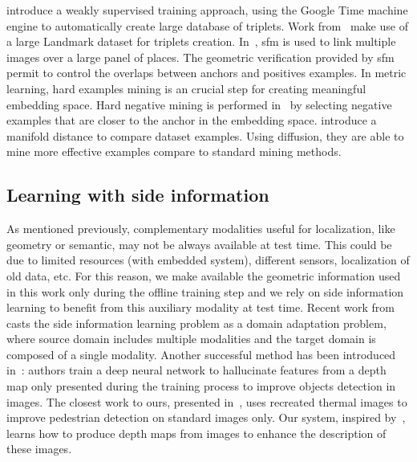 \citet{Arandjelovic2017} introduce a weakly supervised training approach, using the Google Time machine engine to automatically create large database of triplets. Work from~\citep{Gordo2017,Noh2017} make use of a large Landmark dataset for triplets creation. In~\citep{Radenovic2016,Radenovic2017}, \ac{sfm} is used to link multiple images over a large panel of places. The geometric verification provided by \ac{sfm} permit to control the overlaps between anchors and positives examples. In metric learning, hard examples mining is an crucial step for creating meaningful embedding space. Hard negative mining is performed in~\citep{Arandjelovic2017,Radenovic2017,Gordo2016} by selecting negative examples that are closer to the anchor in the embedding space. \citet{Iscen2018} introduce a manifold distance to compare dataset examples. Using diffusion, they are able to mine more effective examples compare to standard mining methods.

\subsection{Learning with side information}
As mentioned previously, complementary modalities useful for localization, like geometry or semantic, may not be always available at test time. This could be due to limited resources (\eg with embedded system), different sensors, localization of old data, etc. For this reason, we make available the geometric information used in this work only during the offline training step and we rely on side information learning to benefit from this auxiliary modality at test time. Recent work from~\cite{Li2017b} casts the side information learning problem as a domain adaptation problem, where source domain includes multiple modalities and the target domain is composed of a single modality. Another successful method has been introduced in~\cite{Hoffman2016}: authors train a deep neural network to hallucinate features from a depth map only presented during the training process to improve objects detection in images. The closest work to ours, presented in~\citep{Xu2017b}, uses recreated thermal images to improve pedestrian detection on standard images only. Our system, inspired by~\citep{Xu2017b}, learns how to produce depth maps from images to enhance the description of these images.

